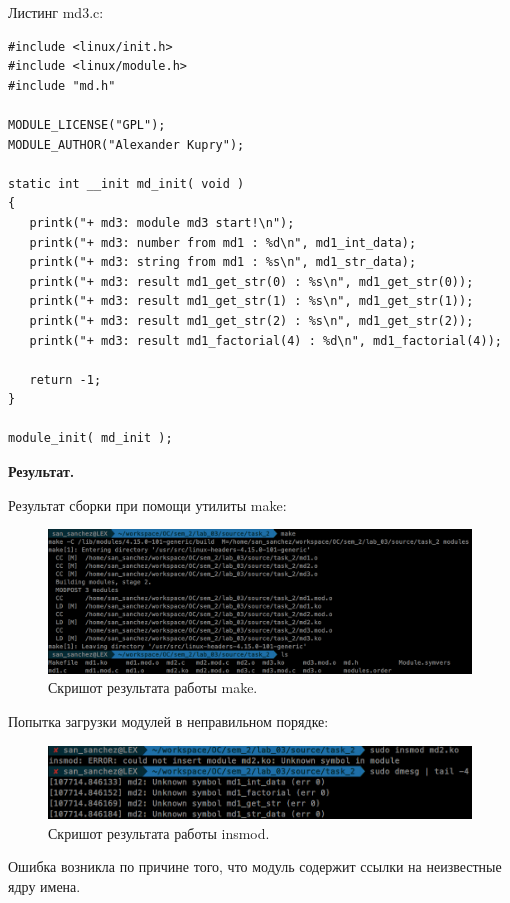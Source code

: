 Листинг md3.c:
\lstset{language=c}
\begin{lstlisting}[caption=Текст header файла md3.c]
#include <linux/init.h> 
#include <linux/module.h> 
#include "md.h" 

MODULE_LICENSE("GPL"); 
MODULE_AUTHOR("Alexander Kupry"); 

static int __init md_init( void ) 
{ 
   printk("+ md3: module md3 start!\n"); 
   printk("+ md3: number from md1 : %d\n", md1_int_data); 
   printk("+ md3: string from md1 : %s\n", md1_str_data); 
   printk("+ md3: result md1_get_str(0) : %s\n", md1_get_str(0));
   printk("+ md3: result md1_get_str(1) : %s\n", md1_get_str(1));
   printk("+ md3: result md1_get_str(2) : %s\n", md1_get_str(2));
   printk("+ md3: result md1_factorial(4) : %d\n", md1_factorial(4));

   return -1; 
} 

module_init( md_init ); 
\end{lstlisting}

\textbf{Результат.}

Результат сборки при помощи утилиты make:

\begin{figure}[H]
    \centering
    \includegraphics[scale=0.38]{data/image/task_2_1.png}
    \caption{Скришот результата работы make.}
\end{figure}

Попытка загрузки модулей в неправильном порядке:

\begin{figure}[H]
    \centering
    \includegraphics[scale=0.5]{data/image/task_2_2.png}
    \caption{Скришот результата работы insmod.}
\end{figure}

Ошибка возникла по причине того, что модуль содержит ссылки на неизвестные ядру имена.

